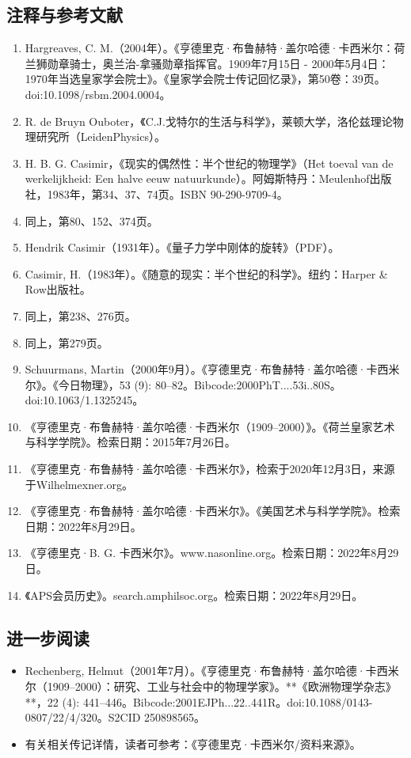 \subsection{注释与参考文献}
\begin{enumerate}
\item Hargreaves, C. M.（2004年）。《亨德里克·布鲁赫特·盖尔哈德·卡西米尔：荷兰狮勋章骑士，奥兰治-拿骚勋章指挥官。1909年7月15日 - 2000年5月4日：1970年当选皇家学会院士》。《皇家学会院士传记回忆录》，第50卷：39页。doi:10.1098/rsbm.2004.0004。
\item R. de Bruyn Ouboter，《C.J.戈特尔的生活与科学》，莱顿大学，洛伦兹理论物理研究所（LeidenPhysics）。
\item H. B. G. Casimir，《现实的偶然性：半个世纪的物理学》（Het toeval van de werkelijkheid: Een halve eeuw natuurkunde）。阿姆斯特丹：Meulenhof出版社，1983年，第34、37、74页。ISBN 90-290-9709-4。
\item 同上，第80、152、374页。
\item Hendrik Casimir（1931年）。《量子力学中刚体的旋转》（PDF）。
\item Casimir, H.（1983年）。《随意的现实：半个世纪的科学》。纽约：Harper & Row出版社。
\item 同上，第238、276页。
\item 同上，第279页。
\item Schuurmans, Martin（2000年9月）。《亨德里克·布鲁赫特·盖尔哈德·卡西米尔》。《今日物理》，53 (9): 80–82。Bibcode:2000PhT....53i..80S。doi:10.1063/1.1325245。
\item 《亨德里克·布鲁赫特·盖尔哈德·卡西米尔（1909–2000）》。《荷兰皇家艺术与科学学院》。检索日期：2015年7月26日。
\item 《亨德里克·布鲁赫特·盖尔哈德·卡西米尔》，检索于2020年12月3日，来源于Wilhelmexner.org。
\item 《亨德里克·布鲁赫特·盖尔哈德·卡西米尔》。《美国艺术与科学学院》。检索日期：2022年8月29日。
\item 《亨德里克·B. G. 卡西米尔》。www.nasonline.org。检索日期：2022年8月29日。
\item 《APS会员历史》。search.amphilsoc.org。检索日期：2022年8月29日。
\end{enumerate}
\subsection{进一步阅读}
\begin{itemize}
\item Rechenberg, Helmut（2001年7月）。《亨德里克·布鲁赫特·盖尔哈德·卡西米尔（1909–2000）：研究、工业与社会中的物理学家》。**《欧洲物理学杂志》**，22 (4): 441–446。Bibcode:2001EJPh...22..441R。doi:10.1088/0143-0807/22/4/320。S2CID 250898565。
\item 有关相关传记详情，读者可参考：《亨德里克·卡西米尔/资料来源》。
\end{itemize}

